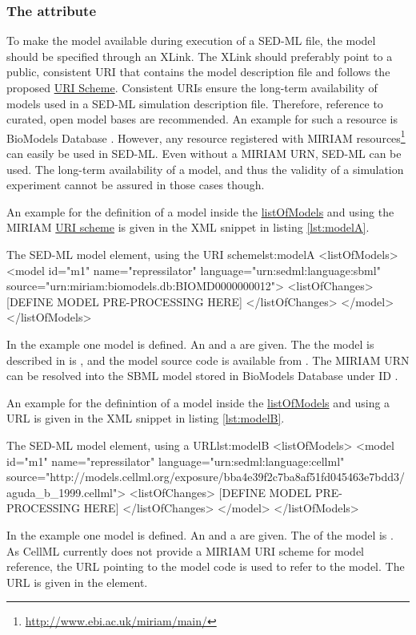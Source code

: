 \subsubsection{The  attribute}
\label{sec:source}
To make the model available during  execution of a SED-ML file, the model  should be specified through an XLink. 
The XLink should preferably point to a public, consistent URI that contains the model description file and follows the proposed \hyperref[sec:uriScheme]{URI Scheme}.
Consistent URIs ensure the long-term availability of models used in a SED-ML simulation description file. 
Therefore, reference to curated, open model bases are recommended. An example for such a resource is BioModels Database \citep{N+06}. However, any resource registered with MIRIAM resources\footnote{\url{http://www.ebi.ac.uk/miriam/main/}} can easily be used in SED-ML. Even without a MIRIAM URN, SED-ML can be used. The long-term availability of a model, and thus the validity of a simulation experiment cannot be assured in those cases though.


An example for the definition of a model inside the \hyperref[sec:listOfModels]{listOfModels} and using the MIRIAM \hyperref[sec:uriScheme]{URI scheme} is given in the XML snippet in listing \ref{lst:modelA}.
%
\begin{myXmlLst}{The SED-ML model element, using the URI scheme}{lst:modelA}
<listOfModels>
 <model id="m1" name="repressilator" language="urn:sedml:language:sbml" 
  source="urn:miriam:biomodels.db:BIOMD0000000012">
  <listOfChanges>
   [DEFINE MODEL PRE-PROCESSING HERE]
  </listOfChanges>
 </model>
</listOfModels>
\end{myXmlLst}
%
In the example one model is defined. An  and a  are given. The  the model is described in is , and the model source code is available from . The MIRIAM URN can be resolved into the SBML model stored in BioModels Database under ID .

An example for the definintion of a model inside the \hyperref[sec:listOfModels]{listOfModels} and using a URL is given in the XML snippet in listing \ref{lst:modelB}.
%
\begin{myXmlLst}{The SED-ML model element, using a URL}{lst:modelB}
<listOfModels>
 <model id="m1" name="repressilator" language="urn:sedml:language:cellml" 
  source="http://models.cellml.org/exposure/bba4e39f2c7ba8af51fd045463e7bdd3/aguda_b_1999.cellml">
  <listOfChanges>
   [DEFINE MODEL PRE-PROCESSING HERE]
  </listOfChanges>
 </model>
</listOfModels>
\end{myXmlLst}
%
In the example one model is defined. An  and a  are given. The  of the model is . As CellML currently does not provide a MIRIAM URI scheme for model reference, the URL pointing to the model code is used to refer to the model. The URL is given in the  element.


